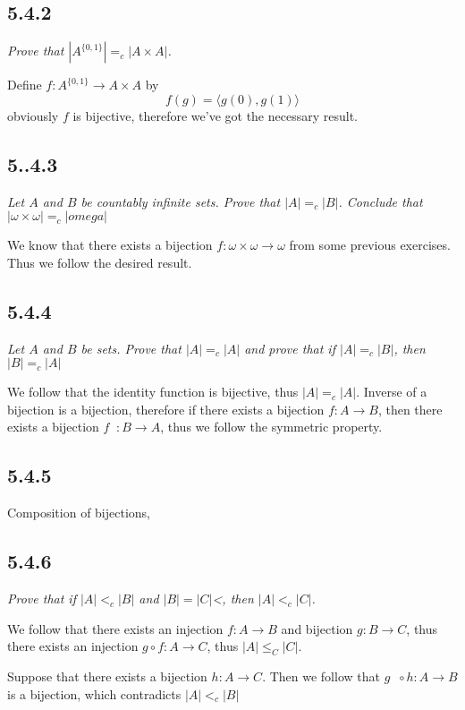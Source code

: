 \documentclass[11pt,oneside,titlepage]{book}
\DeclareMathOperator \inv {^{-1}}
\newcommand{\eangle}[1]{\langle #1 \rangle}
\begin{document}
\subsection{5.4.2}

\textit{Prove that $|A^{\{0, 1\}}| =_c |A \times A|$.}

Define $f: A^{\{0, 1\}} \to A \times A$ by
$$f(g) = \eangle{g(0), g(1)}$$
obviously $f$ is bijective, therefore we've got the necessary result.

\subsection*{5..4.3}

\textit{Let $A$ and $B$ be countably infinite sets. Prove that $|A| =_c |B|$. Conclude
  that $|\omega \times \omega| =_c |omega|$}

We know that there exists a bijection $f: \omega \times \omega \to \omega$ from some previous
exercises. Thus we follow the desired result.

\subsection*{5.4.4}

\textit{Let $A$ and $B$ be sets. Prove that $|A| =_c |A|$ and prove that if $|A| =_c |B|$,
  then $|B| =_c |A|$}

We follow that the identity function is bijective, thus $|A| =_c |A|$. Inverse of a bijection
is a bijection, therefore if there exists  a bijection $f: A \to B$, then there
exists a bijection $f\inv: B \to A$, thus we follow the symmetric property.

\subsection*{5.4.5}

Composition of bijections,

\subsection*{5.4.6}

\textit{Prove that if $|A| <_c |B|$ and $|B|  = |C|$<, then $|A| <_c |C|$.}

We follow that there exists an injection $f: A \to B$ and bijection $g: B \to C$, thus
there exists an injection $g \circ f: A \to C$, thus $|A| \leq_C |C|$.

Suppose that there exists a bijection $h: A \to C$. Then we follow that $g\inv \circ h : A \to B$ is
a bijection, which contradicts $|A| <_c |B|$
\end{document}
